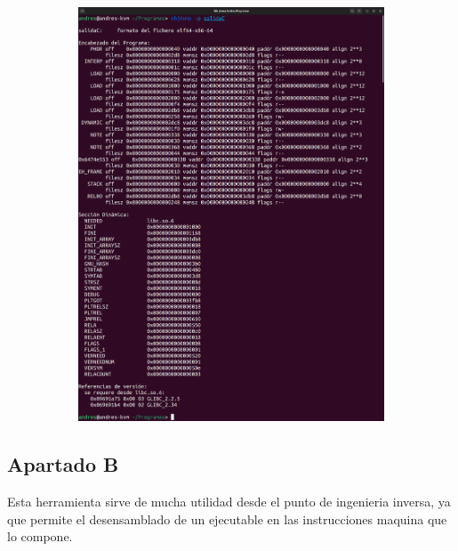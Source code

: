 \documentclass{article}
\begin{document}
\begin{itemize}
\begin{figure}[H]
\begin{subfigure}{0.49\textwidth}
            \includegraphics[width=\textwidth]{imagenes/mergedobjdumpp}
        \end{subfigure}
    \end{figure}    

\end{itemize}


\subsection*{Apartado B}

Esta herramienta sirve de mucha utilidad desde el punto de ingenieria inversa, ya que permite el desensamblado de un ejecutable en las instrucciones maquina que lo compone.

\end{document}
